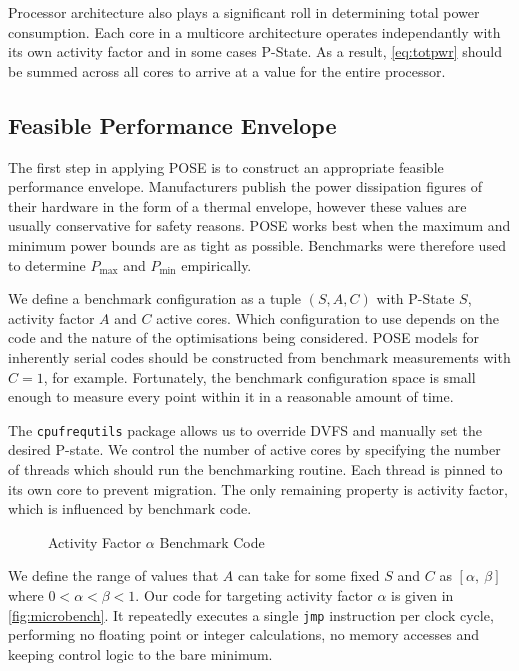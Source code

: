 Processor architecture also plays a significant roll in determining total power consumption.
Each core in a multicore architecture operates independantly with its own activity factor and in some cases P-State.
As a result, \autoref{eq:totpwr} should be summed across all cores to arrive at a value for the entire processor.

\subsection{Feasible Performance Envelope}
The first step in applying POSE is to construct an appropriate feasible performance envelope.
Manufacturers publish the power dissipation figures of their hardware in the form of a thermal envelope, however these values are usually conservative for safety reasons.
POSE works best when the maximum and minimum power bounds are as tight as possible.
Benchmarks were therefore used to determine $P_{\max}$ and $P_{\min}$ empirically.

We define a benchmark configuration as a tuple $(S,A,C)$ with P-State $S$, activity factor $A$ and $C$ active cores.
Which configuration to use depends on the code and the nature of the optimisations being considered.
POSE models for inherently serial codes should be constructed from benchmark measurements with $C = 1$, for example.
Fortunately, the benchmark configuration space is small enough to measure every point within it in a reasonable amount of time.

The \texttt{cpufrequtils} package allows us to override DVFS and manually set the desired P-state.
We control the number of active cores by specifying the number of threads which should run the benchmarking routine.
Each thread is pinned to its own core to prevent migration.
The only remaining property is activity factor, which is influenced by benchmark code.

\begin{figure}[ht]
\centering
\lstset{basicstyle=\ttfamily\footnotesize\bfseries, frame=tb} %

\caption{Activity Factor $\alpha$ Benchmark Code}
\label{fig:microbench}
\end{figure}

We define the range of values that $A$ can take for some fixed $S$ and $C$ as $[\alpha,~\beta]$ where $0 < \alpha < \beta < 1$.
Our code for targeting activity factor $\alpha$ is given in \autoref{fig:microbench}.
It repeatedly executes a single \texttt{jmp} instruction per clock cycle, performing no floating point or integer calculations, no memory accesses and keeping control logic to the bare minimum.

